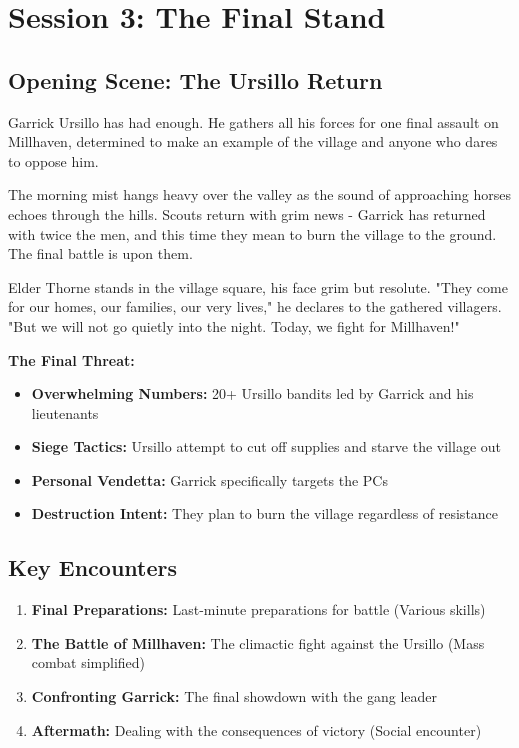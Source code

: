 \documentclass[11pt]{article}
\begin{document}
\section{Session 3: The Final Stand}

\subsection{Opening Scene: The Ursillo Return}

Garrick Ursillo has had enough. He gathers all his forces for one final assault on Millhaven, determined to make an example of the village and anyone who dares to oppose him.

The morning mist hangs heavy over the valley as the sound of approaching horses echoes through the hills. Scouts return with grim news - Garrick has returned with twice the men, and this time they mean to burn the village to the ground. The final battle is upon them.

Elder Thorne stands in the village square, his face grim but resolute. "They come for our homes, our families, our very lives," he declares to the gathered villagers. "But we will not go quietly into the night. Today, we fight for Millhaven!"

\textbf{The Final Threat:}
\begin{itemize}
\item \textbf{Overwhelming Numbers:} 20+ Ursillo bandits led by Garrick and his lieutenants
\item \textbf{Siege Tactics:} Ursillo attempt to cut off supplies and starve the village out
\item \textbf{Personal Vendetta:} Garrick specifically targets the PCs
\item \textbf{Destruction Intent:} They plan to burn the village regardless of resistance
\end{itemize}

\subsection{Key Encounters}

\begin{enumerate}
\item \textbf{Final Preparations:} Last-minute preparations for battle (Various skills)
\item \textbf{The Battle of Millhaven:} The climactic fight against the Ursillo (Mass combat simplified)
\item \textbf{Confronting Garrick:} The final showdown with the gang leader
\item \textbf{Aftermath:} Dealing with the consequences of victory (Social encounter)
\end{enumerate}
\end{document}
